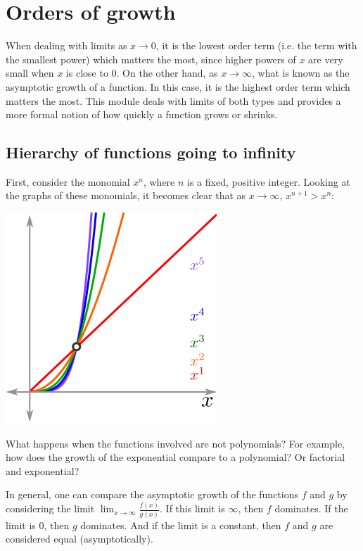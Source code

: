 \documentclass[twoside,openright,titlepage,a4paper]{book}
\begin{document}
\begin{sloppypar}
\section{Orders of growth} \label{ChFunctionsSecOrdersOfGrowth}

When dealing with limits as $x\rightarrow 0$, it is the lowest order term (i.e. the term with the smallest power) which matters the most, since higher powers of $x$ are very small when $x$ is close to 0. On the other hand, as $x \rightarrow \infty$, what is known as the asymptotic growth of a function. In this case, it is the highest order term which matters the most. This module deals with limits of both types and provides a more formal notion of how quickly a function grows or shrinks.

\subsection{Hierarchy of functions going to infinity}

First, consider the monomial $x^n$, where $n$ is a fixed, positive integer. Looking at the graphs of these monomials, it becomes clear that as $x \rightarrow \infty$, $x^{n+1} > x^n$:
\begin{center}\includegraphics[scale=0.6]{AsymptoticMonomial}\end{center}

What happens when the functions involved are not polynomials? For example, how does the growth of the exponential compare to a polynomial? Or factorial and exponential?

In general, one can compare the asymptotic growth of the functions $f$ and $g$ by considering the limit $\lim_{x \rightarrow \infty} \frac{f(x)}{g(x)}$. If this limit is $\infty$, then $f$ dominates. If the limit is 0, then $g$ dominates. And if the limit is a constant, then $f$ and $g$ are considered equal (asymptotically).


\end{sloppypar}
\end{document}
